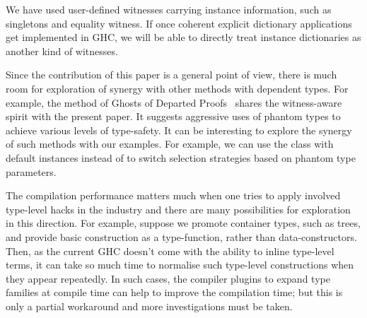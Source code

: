 \documentclass[demotion-paper.tex]{subfiles}
\begin{document}
We have used user-defined witnesses carrying instance information, such as singletons and equality witness.
If once coherent explicit dictionary applications~\cite{Winant:2018wu} get implemented in GHC, we will be able to directly treat instance dictionaries as another kind of witnesses.

Since the contribution of this paper is a general point of view, there is much room for exploration of synergy with other methods with dependent types.
For example, the method of Ghosts of Departed Proofs~\cite{Noonan:2018aa} shares the witness-aware spirit with the present paper.
It suggests aggressive uses of phantom types to achieve various levels of type-safety.
It can be interesting to explore the synergy of such methods with our examples.
For example, we can use the  class with default instances instead of  to switch selection strategies based on phantom type parameters.

The compilation performance matters much when one tries to apply involved type-level hacks in the industry and there are many possibilities for exploration in this direction.
For example, suppose we promote container types, such as trees, and provide basic construction as a type-function, rather than data-constructors.
Then, as the current GHC doesn't come with the ability to inline type-level terms, it can take so much time to normalise such type-level constructions when they appear repeatedly.
In such cases, the compiler plugins to expand type families at compile time can help to improve the compilation time; but this is only a partial workaround and more investigations must be taken.
\end{document}
